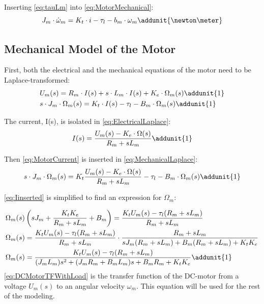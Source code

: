 \startexplain
\stopexplain

Inserting \autoref{eq:tauLm} into \autoref{eq:MotorMechanical}:
\begin{equation}
	J_{m} \cdot \dot{\omega}_{m} = K_{t} \cdot i - \tau_{l} - b_{m} \cdot \omega_{m} \addunit{\newton\meter}
\end{equation}

\subsection*{Mechanical Model of the Motor}
First, both the electrical and the mechanical equations of the motor need to be Laplace-transformed:
\begin{subequations}
	\begin{flalign}
		&U_{m}(s) = R_{m} \cdot I(s) + s \cdot L_{m} \cdot I(s) + K_{e} \cdot \Omega_{m}(s) \addunit{1} \label{eq:ElectricalLaplace}\\	
		&s\cdot J_{m} \cdot \Omega_{m}(s) = K_{t} \cdot I(s) - \tau_{l} - B_{m} \cdot \Omega_{m}(s) \addunit{1}	\label{eq:MechanicalLaplace}
	\end{flalign}
\end{subequations}

The current, I(s), is isolated in \autoref{eq:ElectricalLaplace}:
\begin{equation}
	I(s)=\frac{U_m(s)-K_e\cdot\Omega(s)}{R_m+sL_m} \addunit{1}
	\label{eq:MotorCurrent}
\end{equation}

Then \autoref{eq:MotorCurrent} is inserted in \autoref{eq:MechanicalLaplace}:
\begin{equation}
	s\cdot J_{m} \cdot \Omega_{m}(s) = K_{t} \frac{U_m(s)-K_e\cdot\Omega(s)}{R_m+sL_m} - \tau_{l} - B_{m} \cdot \Omega_{m}(s) \addunit{1}
	\label{eq:Iinserted}	
\end{equation}

\autoref{eq:Iinserted} is simplified to find an expression for $\Omega_m$: 

\begin{subequations}
	\begin{flalign}
		&\Omega_m(s) \left(sJ_m + \frac{K_tK_e}{R_m + sL_m} + B_m \right) = \frac{K_tU_m(s) - \tau_l(R_m + sL_m)}{R_m + sL_m} \\	
		&\Omega_m(s) = \frac{K_tU_m(s) - \tau_l(R_m + sL_m)}{R_m + sL_m} \cdot \frac{R_m + sL_m}{sJ_m(R_m + sL_m) + B_m(R_m + sL_m) + K_tK_e} \\
		&\Omega_m(s) = \frac{K_tU_m(s) - \tau_l(R_m + sL_m)}{(J_mL_m)s^2 + (J_mR_m + B_mL_m)s + B_mR_m + K_tK_e} \addunit{1} \label{eq:DCMotorTFWithLoad}
	\end{flalign}
\end{subequations}
\autoref{eq:DCMotorTFWithLoad} is the transfer function of the DC-motor from a voltage $U_m(s)$ to an angular velocity $\omega_m$. This equation will be used for the rest of the modeling. 

